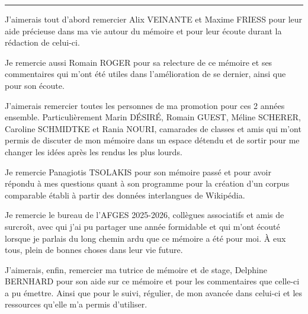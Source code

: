 \noindent\rule{\textwidth}{0.4pt}

J'aimerais tout d'abord remercier {Alix VEINANTE} et {Maxime FRIESS} pour leur aide précieuse dans ma vie autour du mémoire et pour leur écoute durant la
rédaction de celui-ci. 

Je remercie aussi {Romain ROGER} pour sa relecture de ce mémoire et ses commentaires qui m'ont été utiles dans
l'amélioration de se dernier, ainsi que pour son écoute. 

J'aimerais remercier toutes les personnes de ma promotion pour ces 2 années ensemble. Particulièrement {Marin DÉSIRÉ}, {Romain GUEST},
{Méline SCHERER}, {Caroline SCHMIDTKE} et {Rania NOURI}, camarades de classes et amis qui m'ont permis de discuter de mon mémoire dans un espace détendu
et de sortir pour me changer les idées après les rendus les plus lourds.

Je remercie {Panagiotis TSOLAKIS} pour son mémoire passé et pour avoir
répondu à mes questions quant à son programme pour la création d'un corpus comparable établi à partir des données interlangues
de Wikipédia.

Je remercie le bureau de l’AFGES 2025-2026, collègues associatifs et amis de surcroît, avec qui j’ai pu partager une année formidable et qui m’ont écouté
lorsque je parlais du long chemin ardu que ce mémoire a été pour moi. À eux tous, plein de bonnes choses dans leur vie future.

J'aimerais, enfin, remercier ma tutrice de mémoire et de stage, {Delphine BERNHARD} pour son aide sur ce mémoire et pour les commentaires
que celle-ci a pu émettre. Ainsi que pour le suivi, régulier, de mon avancée dans celui-ci et les ressources qu'elle m'a permis
d'utiliser.

\thispagestyle{empty}
\setcounter{page}{0}
\newpage